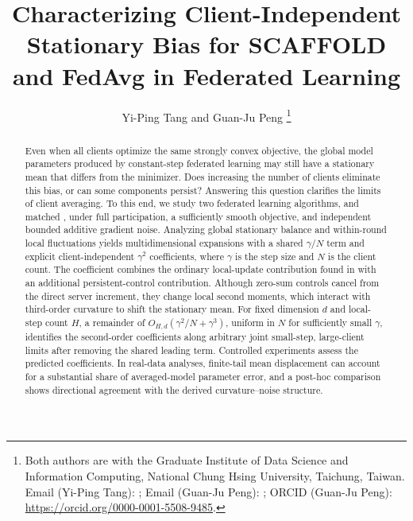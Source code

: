 \documentclass[11pt]{article}
\title{Characterizing Client-Independent Stationary Bias for SCAFFOLD and FedAvg in Federated Learning}
\author{Yi-Ping Tang and Guan-Ju Peng
\thanks{Both authors are with the Graduate Institute of Data Science and Information Computing,
National Chung Hsing University, Taichung, Taiwan.
Email (Yi-Ping Tang): \email{s4109053021@gmail.com};
Email (Guan-Ju Peng): \email{gjpeng@email.nchu.edu.tw};
ORCID (Guan-Ju Peng): \url{https://orcid.org/0000-0001-5508-9485}.}}
\date{}
\begin{document}
\maketitle

\begin{abstract}
Even when all clients optimize the same strongly convex objective, the global model parameters produced by constant-step federated learning may still have a stationary mean that differs from the minimizer. Does increasing the number of clients eliminate this bias, or can some components persist? Answering this question clarifies the limits of client averaging. To this end, we study two federated learning algorithms, \Scaf{} and matched \FedAvg{}, under full participation, a sufficiently smooth objective, and independent bounded additive gradient noise. Analyzing global stationary balance and within-round local fluctuations yields multidimensional expansions with a shared $\gamma/N$ term and explicit client-independent $\gamma^2$ coefficients, where $\gamma$ is the step size and $N$ is the client count. The \Scaf{} coefficient combines the ordinary local-update contribution found in \FedAvg{} with an additional persistent-control contribution. Although zero-sum controls cancel from the direct server increment, they change local second moments, which interact with third-order curvature to shift the stationary mean. For fixed dimension $d$ and local-step count $H$, a remainder of $O_{H,d}(\gamma^2/N+\gamma^3)$, uniform in $N$ for sufficiently small $\gamma$, identifies the second-order coefficients along arbitrary joint small-step, large-client limits after removing the shared leading term. Controlled experiments assess the predicted coefficients. In real-data analyses, finite-tail mean displacement can account for a substantial share of averaged-model parameter error, and a post-hoc comparison shows directional agreement with the derived curvature--noise structure.
\end{abstract}








% 



\clearpage
\begingroup
\raggedright


\endgroup

\clearpage
\appendix



\end{document}
